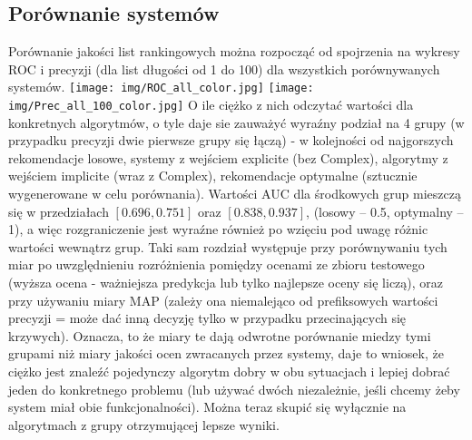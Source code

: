 \documentclass{pracamgr}
\begin{document}
   \subsection{Porównanie systemów}
    Porównanie jakości list rankingowych można rozpocząć od spojrzenia na wykresy ROC i precyzji (dla list długości od 1 do 100)
    dla wszystkich porównywanych systemów.\newline
    \texttt{[image: img/ROC\_all\_color.jpg]}
    \texttt{[image: img/Prec\_all\_100\_color.jpg]}\newline
    O ile ciężko z nich odczytać wartości dla konkretnych algorytmów, o tyle daje sie zauważyć wyraźny podział na 4 grupy
    (w przypadku precyzji dwie pierwsze grupy się łączą) - w kolejności od najgorszych
    rekomendacje losowe, systemy z wejściem explicite (bez Complex), algorytmy z wejściem implicite (wraz z Complex), rekomendacje optymalne
    (sztucznie wygenerowane w celu porównania). Wartości AUC dla środkowych grup mieszczą się w przedziałach $[0.696,0.751]$ oraz $[0.838,0.937]$,
    (losowy -- 0.5, optymalny -- 1), a więc rozgraniczenie jest wyraźne również po wzięciu pod uwagę różnic wartości wewnątrz grup.
    Taki sam rozdział występuje przy porównywaniu tych miar po uwzględnieniu rozróżnienia pomiędzy ocenami
    ze zbioru testowego (wyższa ocena - ważniejsza predykcja lub tylko najlepsze oceny się liczą), oraz przy używaniu miary MAP
    (zależy ona niemalejąco od prefiksowych wartości precyzji = może dać inną decyzję tylko w przypadku przecinających się krzywych).
    Oznacza, to że miary te dają odwrotne porównanie miedzy tymi grupami niż miary jakości ocen zwracanych przez systemy, daje to wniosek,
    że ciężko jest znaleźć pojedynczy algorytm dobry w obu sytuacjach i lepiej dobrać jeden do konkretnego problemu
    (lub używać dwóch niezależnie, jeśli chcemy żeby system miał obie funkcjonalności).
    Można teraz skupić się wyłącznie na algorytmach z grupy otrzymującej lepsze wyniki.\newpage
\end{document}
